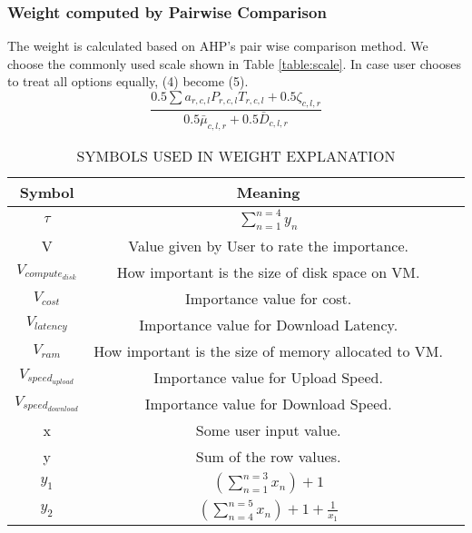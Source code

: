 \documentclass[journal]{IEEEtran}
\begin{document}
\subsubsection{Weight computed by Pairwise Comparison}
\label{subsec:weight&pairwise_comparison}

The weight is calculated based on AHP's pair wise comparison method. We choose the commonly used scale    \cite{ghodsypour1998decision}   \cite{haas2005illustrated} shown in Table \ref{table:scale}. In case user chooses to treat all options equally, (4) become (5).
\begin{equation}
\frac{ 0.5\sum {{a_{r,c,l}}{P_{r,c,l}}{T_{r,c,l}}} + 0.5{\zeta_{c,l,r} }}{{ 0.5{{\bar \mu }_{c,l,r}} + 0.5{{\bar D}_{c,l,r}}}}
\end{equation}


\begin{table}[!h]
\begin{center}\caption{SYMBOLS USED IN WEIGHT EXPLANATION } \label{table:weight_explanation_symbols}
\begin{tabular}{|c|c|c|}
\hline
\textbf{Symbol }&  \textbf{Meaning } \\
\hline $\tau $ & $\sum\limits_{n = 1}^{n = 4} {{y_n}} $ \\
\hline V & Value given by User to rate the importance. \\
\hline $V_{compute_{disk}}$ & How important is the size of disk space on VM. \\
\hline $V_{cost}$ & Importance value for cost. \\
\hline ${V_{latency}}$ & Importance value for Download Latency. \\
\hline $V_{ram}$ & How important is the size of memory allocated to VM. \\
\hline $V_{speed_{upload}}$ & Importance value for Upload Speed. \\
\hline $V_{speed_{download}}$ & Importance value for Download Speed. \\
\hline x & Some user input value. \\
\hline y & Sum of the row values. \\
\hline ${y_1}$ & $\left( {\sum\limits_{n = 1}^{n = 3} {{x_n}} } \right) + 1$ \\
\hline ${y_2}$ & $\left( {\sum\limits_{n = 4}^{n = 5} {{x_n}} } \right) + 1 + \frac{1}{{{x_1}}}$\\
\hline
\end{tabular}
\end{center}
\end{table}
\end{document}
